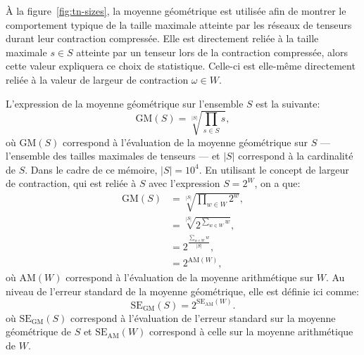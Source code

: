À la figure~\ref{fig:tn-sizes}, la moyenne géométrique est utilisée afin de montrer le comportement typique de la taille maximale atteinte par les réseaux de tenseurs durant leur contraction compressée.
Elle est directement reliée à la taille maximale $s \in S$ atteinte par un tenseur lors de la contraction compressée, alors cette valeur expliquera ce choix de statistique.
Celle-ci est elle-même directement reliée à la valeur de largeur de contraction $\omega \in W$.

L'expression de la moyenne géométrique sur l'ensemble $S$ est la suivante:
\begin{equation}\label{eq:geo_mean}
    \mathrm{GM}(S) = \sqrt[|S|]{\prod_{s \in S} s},
\end{equation}
où $\mathrm{GM}(S)$ correspond à l'évaluation de la moyenne géométrique sur $S$ --- l'ensemble des tailles maximales de tenseurs --- et $|S|$ correspond à la cardinalité de $S$.
Dans le cadre de ce mémoire, $|S| = 10^4$.
En utilisant le concept de largeur de contraction, qui est reliée à $S$ avec l'expression $S = 2^W$, on a que:
\begin{equation}\label{eq:GM}
    \begin{split}
        \mathrm{GM}(S) &= \sqrt[|S|]{\prod_{w \in W} 2^{w}},\\
        &= \sqrt[|S|]{2^{\sum_{w \in W} w}},\\
        &= 2^\frac{\sum_{w \in W} w}{|S|},\\
        &= 2^{\mathrm{AM}(W)},
    \end{split}
\end{equation}
où $\mathrm{AM}(W)$ correspond à l'évaluation de la moyenne arithmétique sur $W$.
Au niveau de l'erreur standard de la moyenne géométrique, elle est définie ici comme:
\begin{equation}\label{eq:standard_error_geo_mean}
    \mathrm{SE}_\mathrm{GM}(S) = 2^{\mathrm{SE}_\mathrm{AM}(W)}.
\end{equation}
où $\mathrm{SE}_\mathrm{GM}(S)$ correspond à l'évaluation de l'erreur standard sur la moyenne géométrique de $S$ et $\mathrm{SE}_\mathrm{AM}(W)$ correspond à celle sur la moyenne arithmétique de $W$.

